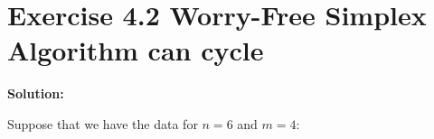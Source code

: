 
\section{Exercise 4.2 Worry-Free Simplex Algorithm can cycle}

\textbf{Solution:}

Suppose that we have the data for $n=6$ and $m=4$:


